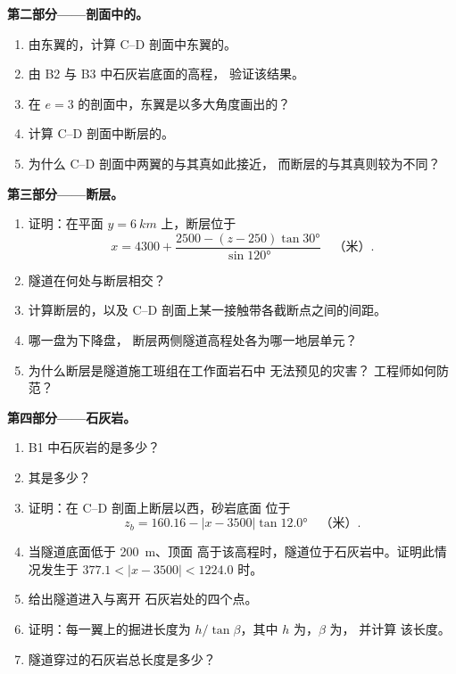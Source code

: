 \begin{problem}
\medskip
\noindent\textbf{第二部分——剖面中的。}
\begin{enumerate}[resume]
  \item 由东翼的，计算 C--D 剖面中东翼的。
  \item 由 B2 与 B3 中石灰岩底面的高程，
        验证该结果。
  \item 在 $e = 3$ 的剖面中，东翼是以多大角度画出的？
  \item 计算 C--D 剖面中断层的。
  \item 为什么 C--D 剖面中两翼的与其真如此接近，
        而断层的与其真则较为不同？
\end{enumerate}

\medskip
\noindent\textbf{第三部分——断层。}
\begin{enumerate}[resume]
  \item 证明：在平面 $y = \qty{6}{km}$ 上，断层位于
        \[ x = 4300 + \frac{2500 - (z - 250)\tan\ang{30}}{\sin\ang{120}}
           \quad\text{（米）}. \]
  \item 隧道在何处与断层相交？
  \item 计算断层的，以及
        C--D 剖面上某一接触带各截断点之间的间距。
  \item 哪一盘为下降盘，
        断层两侧隧道高程处各为哪一地层单元？
  \item 为什么断层是隧道施工班组在工作面岩石中
        无法预见的灾害？
        工程师如何防范？
\end{enumerate}

\medskip
\noindent\textbf{第四部分——石灰岩。}
\begin{enumerate}[resume]
  \item B1 中石灰岩的是多少？
  \item 其是多少？
  \item 证明：在 C--D 剖面上断层以西，砂岩底面
        位于
        \[ z_b = 160.16 - |x - 3500|\tan\ang{12.0} \quad\text{（米）}. \]
  \item 当隧道底面低于 \qty{200}{m}、顶面
        高于该高程时，隧道位于石灰岩中。证明此情况发生于 $377.1 < |x - 3500|
        < 1224.0$ 时。
  \item 给出隧道进入与离开
        石灰岩处的四个点。
  \item 证明：每一翼上的掘进长度为 $h/\tan\beta$，其中 $h$ 为，$\beta$ 为，
        并计算
        该长度。
  \item 隧道穿过的石灰岩总长度是多少？
\end{enumerate}
\end{problem}
